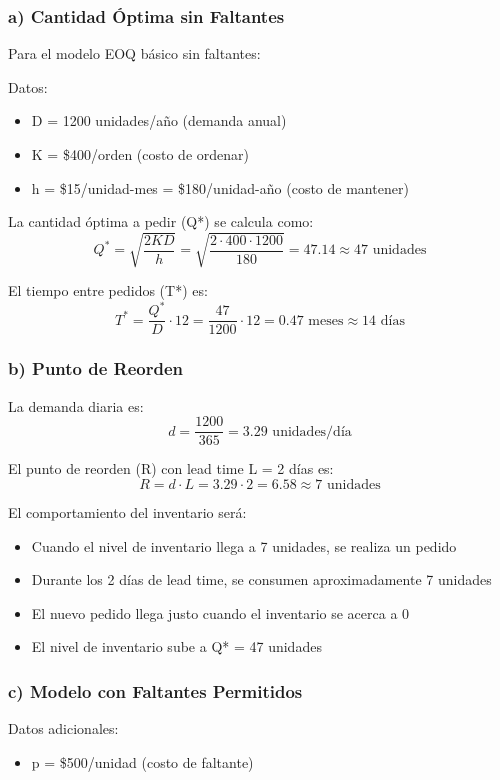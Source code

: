 \documentclass[12pt]{article}
\begin{document}
\subsubsection{a) Cantidad Óptima sin Faltantes}

Para el modelo EOQ básico sin faltantes:

Datos:
\begin{itemize}
    \item D = 1200 unidades/año (demanda anual)
    \item K = \$400/orden (costo de ordenar)
    \item h = \$15/unidad-mes = \$180/unidad-año (costo de mantener)
\end{itemize}

La cantidad óptima a pedir (Q*) se calcula como:
\[
Q^* = \sqrt{\frac{2KD}{h}} = \sqrt{\frac{2 \cdot 400 \cdot 1200}{180}} = 47.14 \approx 47 \text{ unidades}
\]

El tiempo entre pedidos (T*) es:
\[
T^* = \frac{Q^*}{D} \cdot 12 = \frac{47}{1200} \cdot 12 = 0.47 \text{ meses} \approx 14 \text{ días}
\]

\subsubsection{b) Punto de Reorden}

La demanda diaria es:
\[
d = \frac{1200}{365} = 3.29 \text{ unidades/día}
\]

El punto de reorden (R) con lead time L = 2 días es:
\[
R = d \cdot L = 3.29 \cdot 2 = 6.58 \approx 7 \text{ unidades}
\]

El comportamiento del inventario será:
\begin{itemize}
    \item Cuando el nivel de inventario llega a 7 unidades, se realiza un pedido
    \item Durante los 2 días de lead time, se consumen aproximadamente 7 unidades
    \item El nuevo pedido llega justo cuando el inventario se acerca a 0
    \item El nivel de inventario sube a Q* = 47 unidades
\end{itemize}

\subsubsection{c) Modelo con Faltantes Permitidos}

Datos adicionales:
\begin{itemize}
    \item p = \$500/unidad (costo de faltante)
\end{itemize}
\end{document}
